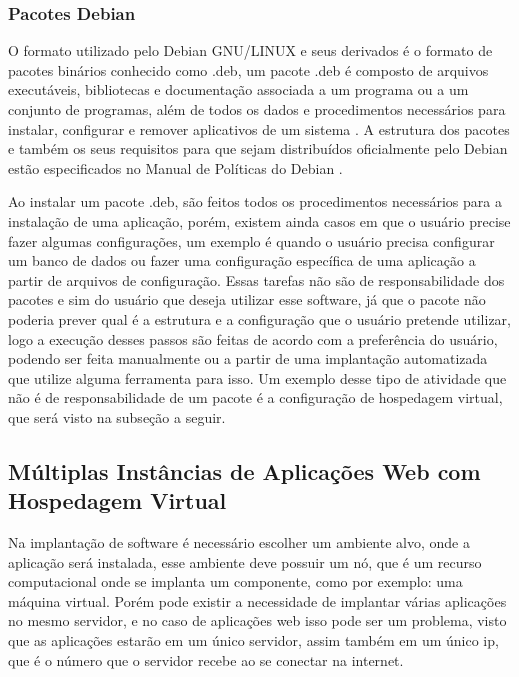 \subsubsection{Pacotes Debian}

O formato utilizado pelo Debian GNU/LINUX e seus derivados é o formato de pacotes
binários conhecido como .deb, um pacote .deb é composto de arquivos executáveis,
bibliotecas e documentação associada a um programa ou a um conjunto de programas,
além de todos os dados e procedimentos necessários para instalar, configurar e remover
aplicativos de um sistema \cite{araujo2011apprecommender}. A estrutura dos pacotes
e também os seus requisitos para que sejam distribuídos oficialmente pelo Debian
estão especificados no Manual de Políticas do Debian \cite{debian}.

Ao instalar um pacote .deb, são feitos todos os procedimentos necessários para a instalação
de uma aplicação, porém, existem ainda casos em que o usuário precise fazer algumas
configurações, um exemplo é quando o usuário precisa configurar um banco de dados
ou fazer uma configuração específica de uma aplicação a partir de arquivos de configuração.
Essas tarefas não são de responsabilidade dos pacotes e sim do usuário que deseja utilizar esse
software, já que o pacote não poderia prever qual é a estrutura e a configuração
que o usuário pretende utilizar, logo a execução desses passos são feitas de
acordo com a preferência do usuário, podendo ser feita manualmente ou a partir
de uma implantação automatizada que utilize alguma ferramenta para isso. Um exemplo
desse tipo de atividade que não é de responsabilidade de um pacote é a configuração
de hospedagem virtual, que será visto na subseção a seguir.

\subsection{Múltiplas Instâncias de Aplicações Web com Hospedagem Virtual}

Na implantação de software é necessário escolher um ambiente alvo, onde a aplicação
será instalada, esse ambiente deve possuir um nó, que é um recurso computacional
onde se implanta um componente, como por exemplo: uma máquina virtual. Porém pode
existir a necessidade de implantar várias aplicações no mesmo servidor, e no caso
de aplicações web isso pode ser um problema, visto que as aplicações estarão em um
único servidor, assim também em um único ip, que é o número que o servidor recebe
ao se conectar na internet.

